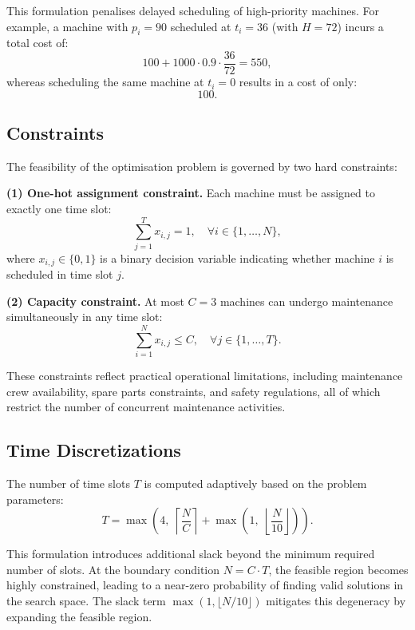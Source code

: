 This formulation penalises delayed scheduling of high-priority machines. For example, a machine with $p_i = 90$ scheduled at $t_i = 36$ (with $H = 72$) incurs a total cost of:
\begin{equation}
100 + 1000 \cdot 0.9 \cdot \frac{36}{72} = 550,
\end{equation}
whereas scheduling the same machine at $t_i = 0$ results in a cost of only:
\begin{equation}
100.
\end{equation}

\subsection{Constraints}
The feasibility of the optimisation problem is governed by two hard constraints:

\textbf{(1) One-hot assignment constraint.}
Each machine must be assigned to exactly one time slot:
\begin{equation}
\sum_{j=1}^{T} x_{i,j} = 1, \quad \forall i \in \{1, \ldots, N\},
\end{equation}
where $x_{i,j} \in \{0,1\}$ is a binary decision variable indicating whether machine $i$ is scheduled in time slot $j$.

\textbf{(2) Capacity constraint.}
At most $C = 3$ machines can undergo maintenance simultaneously in any time slot:
\begin{equation}
\sum_{i=1}^{N} x_{i,j} \leq C, \quad \forall j \in \{1, \ldots, T\}.
\end{equation}

These constraints reflect practical operational limitations, including maintenance crew availability, spare parts constraints, and safety regulations, all of which restrict the number of concurrent maintenance activities.

\subsection{Time Discretizations}
The number of time slots $T$ is computed adaptively based on the problem parameters:
\begin{equation}
T = \max\!\left(4,\; \left\lceil \frac{N}{C} \right\rceil + \max\!\left(1,\; \left\lfloor \frac{N}{10} \right\rfloor \right) \right).
\end{equation}

This formulation introduces additional slack beyond the minimum required number of slots. At the boundary condition $N = C \cdot T$, the feasible region becomes highly constrained, leading to a near-zero probability of finding valid solutions in the search space. The slack term $\max(1, \lfloor N/10 \rfloor)$ mitigates this degeneracy by expanding the feasible region.

